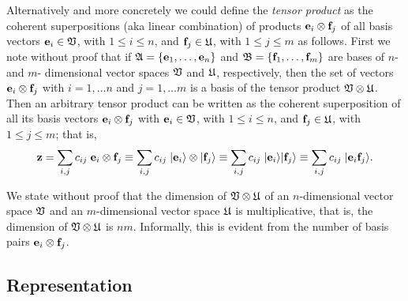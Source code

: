 Alternatively and more concretely
we could define the {\em tensor product}  as the coherent superpositions (aka linear combination)
of products ${\bf e}_i \otimes {\bf f}_j$
of all basis vectors
${\bf e}_i \in  {\frak V}$, with $1\le i \le n$,
and
${\bf f}_j \in  {\frak U}$, with $1\le j \le m$ as follows.
First we note without proof that if ${\frak A} =\{{\bf e}_1,\ldots , {\bf e}_n\}$ and
${\frak B} =\{{\bf f}_1,\ldots , {\bf f}_m\}$
are bases of  $n$- and $m$-
dimensional vector spaces ${\frak V}$ and  ${\frak U}$, respectively,
then the set
of vectors ${\bf e}_i \otimes {\bf f}_j$
with $i=1,\ldots n$ and $j=1,\ldots m$
 is a basis of the { tensor product}
 ${\frak V} \otimes {\frak U}$.
Then an arbitrary tensor product can be written as the coherent superposition of all
its basis vectors ${\bf e}_i \otimes {\bf f}_j$
with
${\bf e}_i \in  {\frak V}$, with $1\le i \le n$,
and
${\bf f}_j \in  {\frak U}$, with $1\le j \le m$; that is,
\begin{equation}
{\bf z}=\sum_{i,j} c_{ij} \; {\bf e}_i \otimes {\bf f}_j
\equiv \sum_{i,j} c_{ij} \; \vert {\bf e}_i \rangle \otimes  \vert {\bf f}_j\rangle
\equiv \sum_{i,j} c_{ij} \; \vert {\bf e}_i \rangle   \vert {\bf f}_j\rangle
\equiv \sum_{i,j} c_{ij} \; \vert {\bf e}_i  {\bf f}_j\rangle
.
\label{2014-m-ch-fdvs-lsqv}
\end{equation}

We state without proof that the dimension
of ${\frak V} \otimes {\frak U}$ of an $n$-dimensional vector space ${\frak V}$
and an $m$-dimensional vector space
${\frak U}$
is multiplicative,
that is, the dimension of  ${\frak V} \otimes {\frak U}$ is $nm$.
Informally, this is evident from the number of basis pairs ${\bf e}_i \otimes {\bf f}_j$.

\subsection{Representation}

